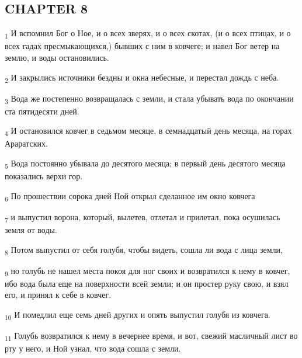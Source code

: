 \subsection{CHAPTER 8}
\begin{tcolorbox}
\textsubscript{1} И вспомнил Бог о Ное, и о всех зверях, и о всех скотах, (и о всех птицах, и о всех гадах пресмыкающихся,) бывших с ним в ковчеге; и навел Бог ветер на землю, и воды остановились.
\end{tcolorbox}
\begin{tcolorbox}
\textsubscript{2} И закрылись источники бездны и окна небесные, и перестал дождь с неба.
\end{tcolorbox}
\begin{tcolorbox}
\textsubscript{3} Вода же постепенно возвращалась с земли, и стала убывать вода по окончании ста пятидесяти дней.
\end{tcolorbox}
\begin{tcolorbox}
\textsubscript{4} И остановился ковчег в седьмом месяце, в семнадцатый день месяца, на горах Араратских.
\end{tcolorbox}
\begin{tcolorbox}
\textsubscript{5} Вода постоянно убывала до десятого месяца; в первый день десятого месяца показались верхи гор.
\end{tcolorbox}
\begin{tcolorbox}
\textsubscript{6} По прошествии сорока дней Ной открыл сделанное им окно ковчега
\end{tcolorbox}
\begin{tcolorbox}
\textsubscript{7} и выпустил ворона, который, вылетев, отлетал и прилетал, пока осушилась земля от воды.
\end{tcolorbox}
\begin{tcolorbox}
\textsubscript{8} Потом выпустил от себя голубя, чтобы видеть, сошла ли вода с лица земли,
\end{tcolorbox}
\begin{tcolorbox}
\textsubscript{9} но голубь не нашел места покоя для ног своих и возвратился к нему в ковчег, ибо вода была еще на поверхности всей земли; и он простер руку свою, и взял его, и принял к себе в ковчег.
\end{tcolorbox}
\begin{tcolorbox}
\textsubscript{10} И помедлил еще семь дней других и опять выпустил голубя из ковчега.
\end{tcolorbox}
\begin{tcolorbox}
\textsubscript{11} Голубь возвратился к нему в вечернее время, и вот, свежий масличный лист во рту у него, и Ной узнал, что вода сошла с земли.
\end{tcolorbox}
